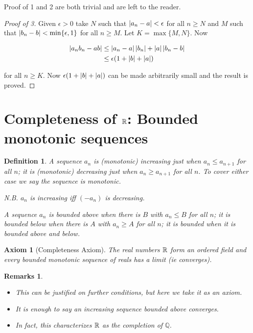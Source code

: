 \documentclass{notes}
\theoremstyle{plain}
\newtheorem{definition}[proposition]{Definition}
\newtheorem*{axiom}{Axiom}
\newtheorem*{remarks}{Remarks}
\newcommand{\Q}{\mathbb{Q}}
\begin{document}
Proof of 1 and 2 are both trivial and are left to the reader.

\begin{proof}[Proof of 3]
Given $ \epsilon > 0 $ take $N$ such that $\left|a_n - a\right| < \epsilon$ for
all $n \ge N$ and $M$ such that $\left|b_n - b\right| < \min \{\epsilon,1\}$ for
all $n \ge M$.  Let $K = \max \{M,N\}$.  Now

\begin{align*}
\left|a_n b_n - a b\right| &\le \left|a_n - a\right| \left|b_n\right| + \left|a\right| \left|b_n -
  b\right| \\
& \le \epsilon (1 + \left|b\right| + \left|a\right|)
\end{align*}

for all $n \ge K$.  Now $\epsilon (1 + \left|b\right| + \left|a\right|)$ can be made
arbitrarily small and the result is proved.
\end{proof}


\section{Completeness of $ \mathbb{R} $: Bounded monotonic sequences}

\begin{definition}
\label{d1.6}
A sequence $ a_{n} $ is (monotonic) \emph{increasing} just when $ 
a_{n} \leq a_{n+1} $ for all $ n $; it is (monotonic) 
\emph{decreasing} just when $ a_{n} \geq a_{n+1} $ for all $ n $. 
To cover either case we say the sequence is \emph{monotonic}.

N.B. $ a_{n}  $ is increasing iff $ (-a_{n})  $ is decreasing.

A sequence $ a_{n} $ is \emph{bounded above} when there is $ B $ 
with $ a_{n} \leq B $ for all $ n $; it is \emph{bounded below} 
when there is $ A $ with $ a_{n} \geq A $ for all $ n $; it is 
\emph{bounded} when it is bounded above and below.
\end{definition}

\begin{axiom}[Completeness Axiom]
The real numbers $\mathbb{R}$ form an ordered field and every bounded 
monotonic sequence of reals has a limit (ie converges).
\end{axiom}

\begin{remarks}
\ 

\begin{itemize}
\item This can be justified on further conditions, but here we take it 
as an axiom.

\item It is enough to say an increasing sequence bounded above 
converges.

\item In fact, this characterizes $ \mathbb{R} $ as the completion of 
$ \Q $.
\end{itemize}
\end{remarks}
\end{document}
